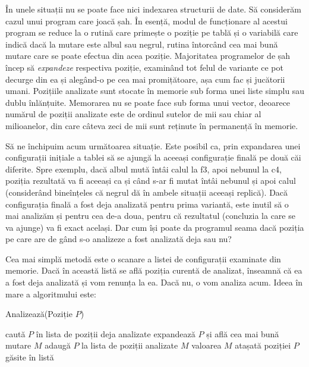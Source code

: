 În unele situații nu se poate face nici indexarea structurii de date. Să
considerăm cazul unui program care joacă șah. În esență, modul de funcționare
al acestui program se reduce la o rutină care primește o poziție pe tablă și o
variabilă care indică dacă la mutare este albul sau negrul, rutina întorcând
cea mai bună mutare care se poate efectua din acea poziție. Majoritatea
programelor de șah încep să {\it expandeze} respectiva poziție, examinând tot
felul de variante ce pot decurge din ea și alegând-o pe cea mai promițătoare,
așa cum fac și jucătorii umani. Pozițiile analizate sunt stocate în memorie
sub forma unei liste simplu sau dublu înlănțuite. Memorarea nu se poate face
sub forma unui vector, deoarece numărul de poziții analizate este de ordinul
sutelor de mii sau chiar al milioanelor, din care câteva zeci de mii sunt
reținute în permanență în memorie.

Să ne închipuim acum următoarea situație. Este posibil ca, prin expandarea
unei configurații inițiale a tablei să se ajungă la aceeași configurație
finală pe două căi diferite. Spre exemplu, dacă albul mută întâi calul la f3,
apoi nebunul la c4, poziția rezultată va fi aceeași ca și când s-ar fi mutat
întâi nebunul și apoi calul (considerând bineînțeles că negrul dă în ambele
situații aceeași replică). Dacă configurația finală a fost deja analizată
pentru prima variantă, este inutil să o mai analizăm și pentru cea de-a doua,
pentru că rezultatul (concluzia la care se va ajunge) va fi exact același. Dar
cum își poate da programul seama dacă poziția pe care are de gând s-o
analizeze a fost analizată deja sau nu?

Cea mai simplă metodă este o scanare a listei de configurații examinate din
memorie. Dacă în această listă se află poziția curentă de analizat, înseamnă
că ea a fost deja analizată și vom renunța la ea. Dacă nu, o vom analiza
acum. Ideea în mare a algoritmului este:

\vspace{\algskip}
\begin{algorithm}
  \caption{Analizează(Poziție $P$)}
  \begin{algorithmic}[1]
    \STATE caută $P$ în lista de poziții deja analizate
    \STATE expandează $P$ și află cea mai bună mutare $M$
    \STATE adaugă $P$ la lista de poziții analizate
    \RETURN $M$
    \ELSE
    \RETURN valoarea $M$ atașată poziției $P$ găsite în listă
    \ENDIF
  \end{algorithmic}  
\end{algorithm}

